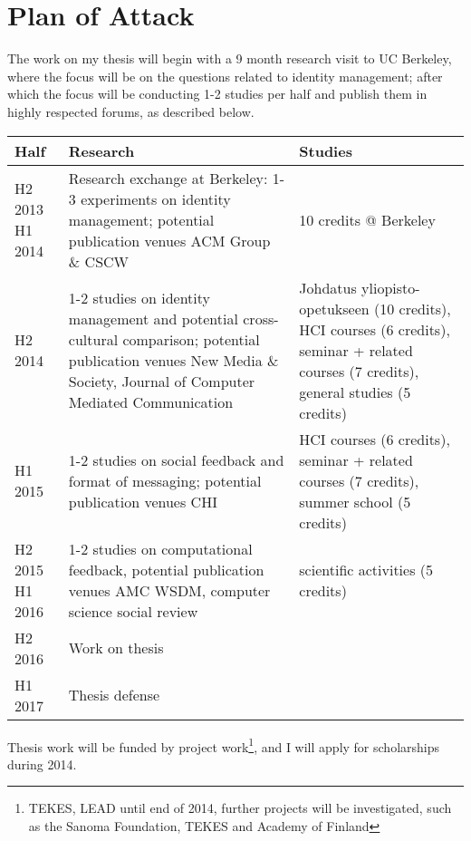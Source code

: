 \documentclass{article}
\begin{document}
\section{Plan of Attack}

The work on my thesis will begin with a 9 month research visit to UC Berkeley, where the focus will be on the questions related to identity management; after which the focus will be conducting 1-2 studies per half and publish them in highly respected forums, as described below.

\begin{table*}[!h]
\begin{tabular}{p{}p{}p{}}
Half & Research & Studies \\ 
\hline 
H2 2013 \newline H1 2014 & Research exchange at Berkeley: 1-3 experiments on identity management; potential publication venues ACM Group \& CSCW & 10 credits @ Berkeley \\ 
\hline
H2 2014 & 1-2 studies on identity management and potential cross-cultural comparison; potential publication venues New Media \& Society, Journal of Computer Mediated Communication & Johdatus yliopisto-opetukseen (10 credits), HCI courses (6 credits), seminar + related courses (7 credits), general studies (5 credits) \\ 
H1 2015 & 1-2 studies on social feedback and format of messaging; potential publication venues CHI & HCI courses (6 credits), seminar + related courses (7 credits), summer school (5 credits) \\ 
\hline
H2 2015 \newline H1 2016 & 1-2 studies on computational feedback, potential publication venues AMC WSDM, computer science social review & scientific activities (5 credits) \\ 
\hline
H2 2016 & Work on thesis & \\ 
H1 2017 & Thesis defense & \\ 
\hline 
\end{tabular} 
\end{table*}

Thesis work will be funded by project work\footnote{TEKES, LEAD until end of 2014, further projects will be investigated, such as the Sanoma Foundation, TEKES and Academy of Finland}, and I will apply for scholarships during 2014.

\end{document}
